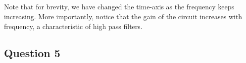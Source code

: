 \documentclass[10pt,notitlepage,onecolumn,aps,pra]{revtex4-1}
\begin{document}
    \begin{center}
    \end{center}
    { \hspace*{\fill} \\}
    
    \begin{center}
    \end{center}
    { \hspace*{\fill} \\}
    
    \begin{center}
    \end{center}
    { \hspace*{\fill} \\}
    
    \begin{center}
    \end{center}
    { \hspace*{\fill} \\}
    
    Note that for brevity, we have changed the time-axis as the frequency
keeps increasing. More importantly, notice that the gain of the circuit
increases with frequency, a characteristic of high pass filters.

\hypertarget{question-5}{%
\subsection{Question 5}\label{question-5}}
\end{document}
